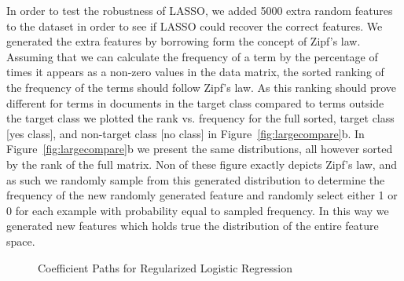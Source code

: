 In order to test the robustness of LASSO, we added 5000 extra random features to the dataset in order to see if LASSO could recover the correct features. We generated the extra features by borrowing form the concept of Zipf's law. Assuming that we can calculate the frequency of a term by the percentage of times it appears as a non-zero values in the data matrix, the sorted ranking of the frequency of the terms should follow Zipf's law.  As this ranking should prove different for terms in documents in the target class compared to terms outside the target class we plotted the rank vs. frequency for the full sorted, target class [yes class], and non-target class [no class] in Figure~\ref{fig:largecompare}b. In Figure~\ref{fig:largecompare}b we present the same distributions, all however sorted by the rank of the full matrix. Non of these figure exactly depicts Zipf's law, and as such we randomly sample from this generated distribution to determine the frequency of the new randomly generated feature and randomly select either 1 or 0 for each example with probability equal to sampled frequency. In this way we generated new features which holds true the distribution of the entire feature space.



\begin{figure}[!ht]
\centering
{}
\caption{Coefficient Paths for Regularized Logistic Regression}
\end{figure}


